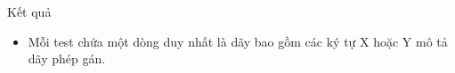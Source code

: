 Kết quả  
\begin{itemize}
	\item     Mỗi test chứa một dòng duy nhất là dãy bao gồm các ký tự X hoặc Y mô tả dãy phép gán.   
\end{itemize}